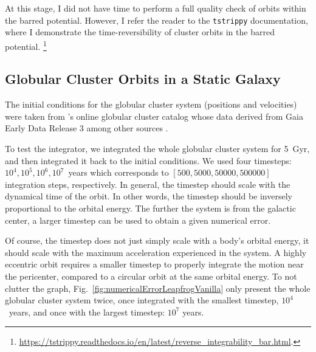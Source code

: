     At this stage, I did not have time to perform a full quality check of orbits within the barred potential. However, I refer the reader to the \texttt{tstrippy} documentation, where I demonstrate the time-reversibility of cluster orbits in the barred potential. \footnote{\url{https://tstrippy.readthedocs.io/en/latest/reverse_integrability_bar.html}.}
    



    \subsection{Globular Cluster Orbits in a Static Galaxy}
        The initial conditions for the globular cluster system (positions and velocities) were taken from \citet{2018MNRAS.478.1520B}'s online globular cluster catalog whose data derived from Gaia Early Data Release 3 among other sources \citep{2021MNRAS.505.5957B,2021A&A...649A...1G,2021MNRAS.505.5978V,2023A&A...674A...1G}.

        To test the integrator, we integrated the whole globular cluster system for 5~Gyr, and then integrated it back to the initial conditions. We used four timesteps: $10^4,10^5,10^6,10^7$~years which corresponds to $\left[500,5000,50000,500000\right]$ integration steps, respectively. In general, the timestep should scale with the dynamical time of the orbit. In other words, the timestep should be inversely proportional to the orbital energy. The further the system is from the galactic center, a larger timestep can be used to obtain a given numerical error. 
        
        Of course, the timestep does not just simply scale with a body's orbital energy, it should scale with the maximum acceleration experienced in the system. A highly eccentric orbit requires a smaller timestep to properly integrate the motion near the pericenter, compared to a circular orbit at the same orbital energy. To not clutter the graph, Fig.~\ref{fig:numericalErrorLeapfrogVanilla} only present the whole globular cluster system twice, once integrated with the smallest timestep, $10^4$~years, and once with the largest timestep: $10^7$ years.

